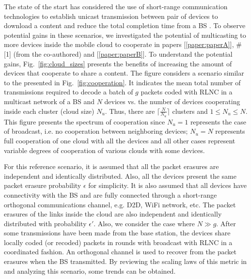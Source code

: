 The state of the start has considered the use of short-range communication technologies to establish unicast transmission between pair of devices to download a content and reduce the total completion time from a \ac{BS} \cite{khamfroush2013minimizing,khamfroush2015optimal}. To observe potential gains in these scenarios, we investigated the potential of multicasting to more devices inside the mobile cloud to cooperate in papers {[\ref{paper:paperA}]}, \#[1] (from the co-authored) and {[\ref{paper:paperB}]}. To understand the potential gains, Fig.~\ref{fig:cloud_sizes} presents the benefits of increasing the amount of devices that cooperate to share a content. The figure considers a scenario similar to the presented in Fig.~\ref{fig:cooperation}. It indicates the mean total number of transmissions required to decode a batch of $g$ packets coded with \ac{RLNC} in a multicast network of a \ac{BS} and $N$ devices vs. the number of devices cooperating inside each cluster (cloud size) $N_u$. Thus, there are $\lceil \frac{N}{N_u} \rceil$ clusters and $1 \leq N_u \leq N$. This figure presents the spectrum of cooperation since $N_u = 1$ represents the case of broadcast, i.e. no cooperation between neighboring devices; $N_u = N$ represents full cooperation of one cloud with all the devices and all other cases represent variable degrees of cooperation of various clouds with some devices.

For this reference scenario, it is assumed that all the packet erasures are independent and identically distributed. Also, all the devices present the same packet erasure probability $\epsilon$ for simplicity. It is also assumed that all devices have connectivity with the \ac{BS} and are fully connected through a short-range orthogonal communications channel, e.g. \ac{D2D}, \ac{WiFi} network, etc. The packet erasures of the links inside the cloud are also independent and identically distributed with probability $\epsilon'$. Also, we consider the case where $N \gg g$. After some transmissions have been made from the base station, the devices share locally coded (or recoded) packets in rounds with broadcast with \ac{RLNC} in a coordinated fashion. An orthogonal channel is used to recover from the packet erasures when the \ac{BS} transmitted. By reviewing the scaling laws of this metric in \cite{eryilmaz2008delay} and analyzing this scenario, some trends can be obtained.

